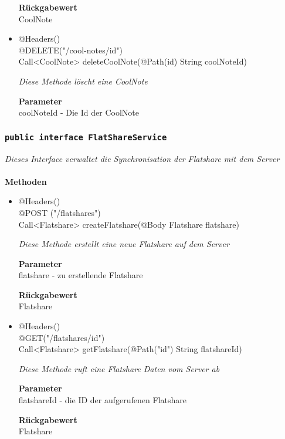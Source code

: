\documentclass[a4paper]{scrreprt}
\begin{document}
\begin{itemize}
        		\textbf{Rückgabewert} \\
                CoolNote
        	
            
              \item{@Headers() \\ @DELETE("/cool-notes/{id}")\\ Call<CoolNote> deleteCoolNote(@Path(\grqq id\grqq) String coolNoteId)}
        	
      	 	 	\textit{Diese Methode löscht eine CoolNote }
        	
        		\textbf{Parameter} \\
        		coolNoteId - Die Id der CoolNote 
        	
                                
       		 \end{itemize}
             
             
             	\subsubsection{\texttt{public interface  FlatShareService }}
        \textit{Dieses Interface verwaltet die Synchronisation der Flatshare mit dem Server}\\
        \\
		\textbf{Methoden} \\
 			\begin{itemize}
        		\item{@Headers()\\ @POST ("/flatshares") \\
   Call<Flatshare> createFlatshare(@Body Flatshare flatshare)
}
        	
        		\textit{Diese Methode erstellt eine neue Flatshare auf dem Server
}
        	
        		\textbf{Parameter} \\
                flatshare - zu erstellende Flatshare 
        		        	
       		 	\textbf{Rückgabewert} \\
                Flatshare
      		  	 
      	      \item{@Headers()\\  @GET("/flatshares/{id}")\\ Call<Flatshare> getFlatshare(@Path("id") 					String flatshareId)}
        	
      	 	 	\textit{Diese Methode ruft eine Flatshare Daten vom Server ab }
        	
        		\textbf{Parameter} \\
        		flatshareId - die ID der aufgerufenen Flatshare 
        	
        		\textbf{Rückgabewert} \\
                Flatshare
                      	
       	
       		 \end{itemize}
             
\end{document}
